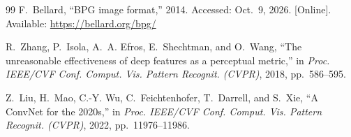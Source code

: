 \documentclass[journal]{IEEEtran}
\begin{document}
\begin{thebibliography}{99}
F.~Bellard, ``BPG image format,'' 2014. Accessed: Oct.~9, 2026. [Online]. Available: \url{https://bellard.org/bpg/}

R.~Zhang, P.~Isola, A.~A. Efros, E.~Shechtman, and O.~Wang, ``The unreasonable effectiveness of deep features as a perceptual metric,'' in \emph{Proc. IEEE/CVF Conf. Comput. Vis. Pattern Recognit. (CVPR)}, 2018, pp.~586--595.

Z.~Liu, H.~Mao, C.-Y. Wu, C.~Feichtenhofer, T.~Darrell, and S.~Xie, ``A ConvNet for the 2020s,'' in \emph{Proc. IEEE/CVF Conf. Comput. Vis. Pattern Recognit. (CVPR)}, 2022, pp.~11976--11986.

\end{thebibliography}
\end{document}
